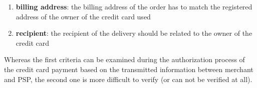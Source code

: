 \begin{enumerate}
  \item \textbf{billing address}: the billing address of the order has to match the registered address of the owner of the credit card used
  \item \textbf{recipient}: the recipient of the delivery should be related to the owner of the credit card
\end{enumerate}

Whereas the first criteria can be examined during the authorization process of the credit card payment based on the transmitted information between merchant and \gls{PSP}, the second one is more difficult to verify (or can not be verified at all).


